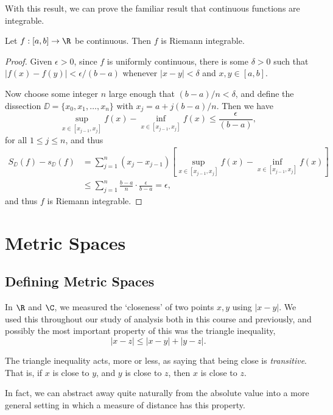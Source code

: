 With this result, we can prove the familiar result that continuous functions are integrable.

\begin{theorem}
	Let $f:[a, b] \rightarrow \R$ be continuous. Then $f$ is Riemann integrable.
\end{theorem}
\begin{proof}
	Given $\epsilon > 0$, since $f$ is uniformly continuous, there is some $\delta > 0$ such that $|f(x) - f(y)| < \epsilon/(b - a)$ whenever $|x - y| < \delta$ and $x, y \in [a, b]$.

	Now choose some integer $n$ large enough that $(b - a)/n < \delta$, and define the dissection $\DD = \{x_0, x_1, \dots, x_n\}$ with $x_j = a + j(b - a)/n$. Then we have
	$$
	\sup_{x \in [x_{j - 1}, x_j]} f(x) - \inf_{x \in [x_{j - 1}, x_j]} f(x) \leq \frac{\epsilon}{(b - a)},
	$$
	for all $1 \leq j \leq n$, and thus 
	\begin{align*}
		S_\DD(f) - s_\DD(f) &= \sum_{j = 1}^n (x_j - x_{j - 1})\left[\sup_{x \in [x_{j - 1}, x_j]} f(x) - \inf_{x \in [x_{j - 1}, x_j]} f(x)\right] \\
		&\leq \sum_{j = 1}^n \frac{b - a}{n} \cdot \frac{\epsilon}{b - a} = \epsilon,
	\end{align*}
	and thus $f$ is Riemann integrable.
\end{proof}

\section{Metric Spaces}

\subsection{Defining Metric Spaces}

In $\R$ and $\C$, we measured the `closeness' of two points $x, y$ using $|x - y|$. We used this throughout our study of analysis both in this course and previously, and possibly the most important property of this was the triangle inequality,
$$
|x - z| \leq |x - y| + |y - z|.
$$

The triangle inequality acts, more or less, as saying that being close is \emph{transitive}. That is, if $x$ is close to $y$, and $y$ is close to $z$, then $x$ is close to $z$.

In fact, we can abstract away quite naturally from the absolute value into a more general setting in which a measure of distance has this property.

